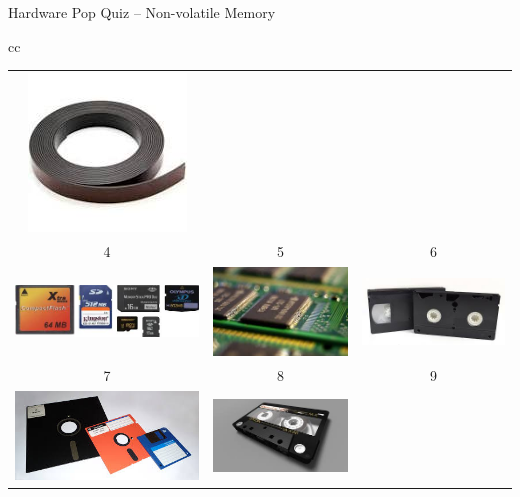 \documentclass[compress,11pt,xcolor=svgnames,aspectratio=169]{beamer}
\begin{document}
\begin{frame}[t]{Hardware Pop Quiz -- Non-volatile Memory}
\begin{center}
\begin{tabular}{cc}
\begin{tabular}{ccc}
\includegraphics[scale=0.15]{fig/tape} \\
4 & 5 & 6 \\
\includegraphics[scale=0.15]{fig/card} &
\includegraphics[scale=0.15]{fig/rom} &
\includegraphics[scale=0.15]{fig/vhs} \\
7 & 8 & 9 \\
\includegraphics[scale=0.15]{fig/floppy} &
\includegraphics[scale=0.15]{fig/k7} &

\end{tabular}
\end{tabular}
\end{center}
\end{frame}
\end{document}
